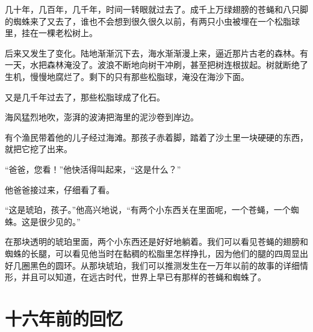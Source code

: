 \documentclass[12pt,UTF-8,openany]{ctexbook}
\begin{document}
\begin{large}
    几十年，几百年，几千年，时间一转眼就过去了。成千上万绿翅膀的苍蝇和八只脚的蜘蛛来了又去了，谁也不会想到很久很久以前，有两只小虫被埋在一个松脂球里，挂在一棵老松树上。
    
    后来又发生了变化。陆地渐渐沉下去，海水渐渐漫上来，逼近那片古老的森林。有一天，水把森林淹没了。波浪不断地向树干冲刷，甚至把树连根拔起。树就断绝了生机，慢慢地腐烂了。剩下的只有那些松脂球，淹没在海沙下面。
    
    又是几千年过去了，那些松脂球成了化石。
    
    海风猛烈地吹，澎湃的波涛把海里的泥沙卷到岸边。
    
    有个渔民带着他的儿子经过海滩。那孩子赤着脚，踏着了沙土里一块硬硬的东西，就把它挖了出来。
    
    “爸爸，您看！”他快活得叫起来，“这是什么？”
    
    他爸爸接过来，仔细看了看。
    
    “这是琥珀，孩子。”他高兴地说，“有两个小东西关在里面呢，一个苍蝇，一个蜘蛛。这是很少见的。”
    
    在那块透明的琥珀里面，两个小东西还是好好地躺着。我们可以看见苍蝇的翅膀和蜘蛛的长腿，可以看见他当时在黏稠的松脂里怎样挣扎，因为他们的腿的四周显出好几圈黑色的圆环。从那块琥珀，我们可以推测发生在一万年以前的故事的详细情形，并且可以知道，在远古时代，世界上早已有那样的苍蝇和蜘蛛了。
    
\end{large}



\chapter{十六年前的回忆}
\end{document}
